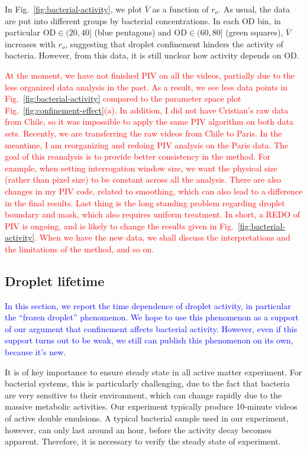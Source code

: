 \documentclass[%
10pt,
superscriptaddress,
twocolumn,
 amsmath,amssymb,
 aps,prx,
]{revtex4-2}
\begin{document}
In Fig.~\ref{fig:bacterial-activity}, we plot $\overline V$ as a function of $r_o$.
As usual, the data are put into different groups by bacterial concentrations.
In each OD bin, in particular $\text{OD}\in(20, 40]$ (blue pentagons) and $\text{OD}\in(60, 80]$ (green squares), $\overline V$ increases with $r_o$, suggesting that droplet confinement hinders the activity of bacteria.
However, from this data, it is still unclear how activity depends on OD.

\textcolor{red}{
At the moment, we have not finished PIV on all the videos, partially due to the less organized data analysis in the past.
As a result, we see less data points in Fig.~\ref{fig:bacterial-activity} compared to the parameter space plot Fig.~\ref{fig:confinement-effect}(a).
In addition, I did not have Cristian's raw data from Chile, so it was impossible to apply the same PIV algorithm on both data sets.
Recently, we are transferring the raw videos from Chile to Paris.
In the meantime, I am reorganizing and redoing PIV analysis on the Paris data.
The goal of this reanalysis is to provide better consistency in the method.
For example, when setting interrogation window size, we want the physical size (rather than pixel size) to be constant across all the analysis.
There are also changes in my PIV code, related to smoothing, which can also lead to a difference in the final results.
Last thing is the long standing problem regarding droplet boundary and mask, which also requires uniform treatment.
In short, a REDO of PIV is ongoing, and is likely to change the results given in Fig.~\ref{fig:bacterial-activity}.
When we have the new data, we shall discuss the interpretations and the limitations of the method, and so on.
}
\subsection{Droplet lifetime}
\textcolor{blue}{
In this section, we report the time dependence of droplet activity, in particular the ``frozen droplet'' phenomenon.
We hope to use this phenomenon as a support of our argument that confinement affects bacterial activity.
However, even if this support turns out to be weak, we still can publish this phenomenon on its own, because it's new.
}

It is of key importance to ensure steady state in all active matter experiment.
For bacterial systems, this is particularly challenging, due to the fact that bacteria are very sensitive to their environment, which can change rapidly due to the massive metabolic activities. 
Our experiment typically produce 10-minute videos of active double emulsions. 
A typical bacterial sample used in our experiment, however, can only last around an hour, before the activity decay becomes apparent. 
Therefore, it is necessary to verify the steady state of experiment. 
\end{document}
